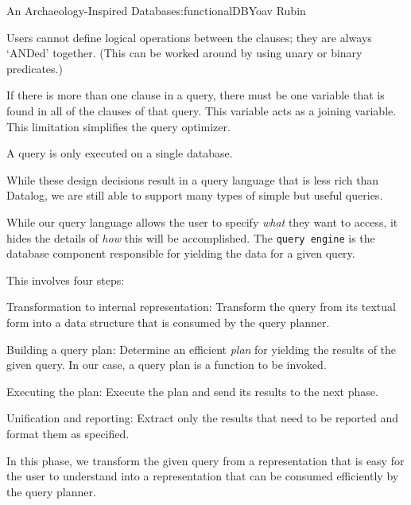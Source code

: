 \begin{aosachapter}{An Archaeology-Inspired Database}{s:functionalDB}{Yoav Rubin}
\begin{aosaitemize}

\item
  Users cannot define logical operations between the clauses; they are
  always `ANDed' together. (This can be worked around by using unary or
  binary predicates.)
\item
  If there is more than one clause in a query, there must be one
  variable that is found in all of the clauses of that query. This
  variable acts as a joining variable. This limitation simplifies the
  query optimizer.
\item
  A query is only executed on a single database.
\end{aosaitemize}

While these design decisions result in a query language that is less
rich than Datalog, we are still able to support many types of simple but
useful queries.

\label{query-engine-design}

While our query language allows the user to specify \emph{what} they
want to access, it hides the details of \emph{how} this will be
accomplished. The \texttt{query engine} is the database component
responsible for yielding the data for a given query.

This involves four steps:

\begin{aosaenumerate}
\def\labelenumi{\arabic{enumi}.}

\item
  Transformation to internal representation: Transform the query from
  its textual form into a data structure that is consumed by the query
  planner.
\item
  Building a query plan: Determine an efficient \emph{plan} for yielding
  the results of the given query. In our case, a query plan is a
  function to be invoked.
\item
  Executing the plan: Execute the plan and send its results to the next
  phase.
\item
  Unification and reporting: Extract only the results that need to be
  reported and format them as specified.
\end{aosaenumerate}

\label{phase-1-transformation}

In this phase, we transform the given query from a representation that
is easy for the user to understand into a representation that can be
consumed efficiently by the query planner.


\end{aosachapter}
